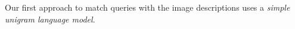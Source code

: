 Our first approach to match queries with the image descriptions uses a \textit{simple unigram language model}. 
